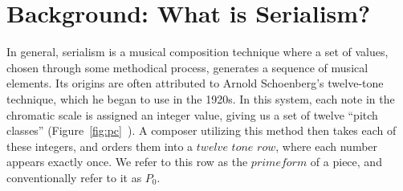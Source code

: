 \section{Background: What is Serialism?}

In general, serialism is a musical composition technique where a set of values, chosen through some methodical process, 
generates a sequence of musical elements. Its origins are often attributed to Arnold Schoenberg's twelve-tone technique, which
he began to use in the 1920s. In this system, each note in the chromatic scale is assigned an integer value, giving us a set of twelve
``pitch classes'' (Figure~\ref{fig:pc}~\cite{appleby2013accidentals}).
A composer utilizing this method then takes each of these integers, and orders them into a $twelve$ $tone$ $row$, where 
each number appears exactly once. We refer to this row as the $prime form$ of a piece, and conventionally refer 
to it as $P_0$. 

